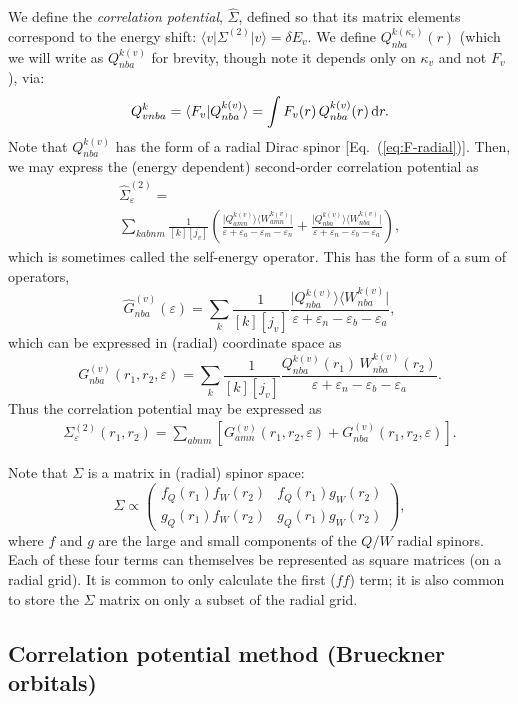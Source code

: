 \documentclass[10pt,twocolumn,a4paper]{article}%
\newcommand{\bra}[1]{\ensuremath{\langle #1|}}	%
\newcommand{\ket}[1]{\ensuremath{|#1\rangle}}	%
\newcommand{\braket}[1]{\ensuremath{\langle #1\rangle}}	%
\newcommand{\matr}[4]{\ensuremath{\begin{pmatrix}#1&#2\\#3&#4\end{pmatrix}}}	%
\newcommand{\be}{\begin{equation}}
\newcommand{\ee}{\end{equation}}
\def\d{\ensuremath{{\rm d}}}
\def\en{\ensuremath{\varepsilon}}
\begin{document}
We define the {\em correlation potential}, $\hat \Sigma$, defined so that its matrix elements correspond to the energy shift: $\bra{v}\Sigma^{(2)}\ket{v} = \delta E_v$.
We define
$Q^{k(\kappa_v)}_{nba}(r)$ (which we will write as $Q^{k(v)}_{nba}$ for brevity, though note it depends only on $\kappa_v$ and not $F_v$), via:
\be
Q^k_{vnba} 
= \braket{F_v|Q^{k(v)}_{nba}}
= \int F_v(r) \, Q^{k(v)}_{nba}(r)\,\d r.
\ee
Note that $Q_{nba}^{k(v)}$ has the form of a radial Dirac spinor [Eq.~(\ref{eq:F-radial})].
Then, we may express the (energy dependent) second-order correlation potential as
\begin{multline}
\hat \Sigma^{(2)}_{\en} = \\
\sum_{kabnm}\frac{1}{[k][j_v]}\left(
\frac{\ket{Q^{k(v)}_{amn}}\bra{W^{k(v)}_{amn}}}
{\en + \en_a-\en_m-\en_n}
+
\frac{\ket{Q^{k(v)}_{nba}}\bra{W^{k(v)}_{nba}}}
{\en + \en_n-\en_b-\en_a}
\right),
\end{multline}
which is sometimes called the self-energy operator.
This has the form of a sum of operators,
\be
\hat G^{(v)}_{nba}(\en) = \sum_{k}\frac{1}{[k][j_v]}\frac{\ket{Q^{k(v)}_{nba}}\bra{W^{k(v)}_{nba}}}
{\en+\en_n-\en_b-\en_a},
\ee
which can be expressed in (radial) coordinate space as
\be
G^{(v)}_{nba}(r_1,r_2,\en) = \sum_{k}\frac{1}{[k][j_v]}
\frac{Q^{k(v)}_{nba}(r_1)\, W^{k(v)}_{nba}(r_2)}
{\en + \en_n-\en_b-\en_a}.
\ee
Thus the correlation potential may be expressed as
\begin{multline}
\Sigma^{(2)}_{\en}(r_1,r_2) = 
\sum_{abnm}\left[
G^{(v)}_{amn}(r_1,r_2,\en)
+
G^{(v)}_{nba}(r_1,r_2,\en)
\right].
\end{multline}

Note that $\Sigma$ is a matrix in (radial) spinor space:
\be
\Sigma \propto \matr{f_Q(r_1)f_W(r_2)}{f_Q(r_1)g_W(r_2)}{g_Q(r_1)f_W(r_2)}{g_Q(r_1)g_W(r_2)},
\ee
where $f$ and $g$ are the large and small components of the $Q/W$ radial spinors.
Each of these four terms can themselves be represented as square matrices (on a radial grid).
It is common to only calculate the first ($ff$) term; it is also common to store the $\Sigma$ matrix on only a subset of the radial grid.

\subsection{Correlation potential method (Brueckner orbitals)}
\end{document}
